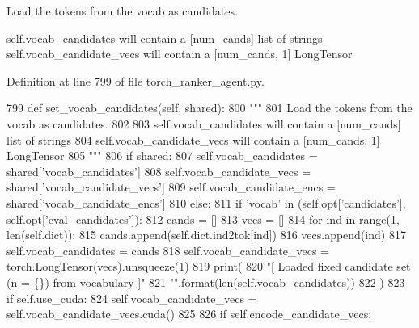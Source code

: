 \begin{DoxyVerb}Load the tokens from the vocab as candidates.

self.vocab_candidates will contain a [num_cands] list of strings
self.vocab_candidate_vecs will contain a [num_cands, 1] LongTensor
\end{DoxyVerb}
 

Definition at line 799 of file torch\+\_\+ranker\+\_\+agent.\+py.


\begin{DoxyCode}
799     \textcolor{keyword}{def }set\_vocab\_candidates(self, shared):
800         \textcolor{stringliteral}{"""}
801 \textcolor{stringliteral}{        Load the tokens from the vocab as candidates.}
802 \textcolor{stringliteral}{}
803 \textcolor{stringliteral}{        self.vocab\_candidates will contain a [num\_cands] list of strings}
804 \textcolor{stringliteral}{        self.vocab\_candidate\_vecs will contain a [num\_cands, 1] LongTensor}
805 \textcolor{stringliteral}{        """}
806         \textcolor{keywordflow}{if} shared:
807             self.vocab\_candidates = shared[\textcolor{stringliteral}{'vocab\_candidates'}]
808             self.vocab\_candidate\_vecs = shared[\textcolor{stringliteral}{'vocab\_candidate\_vecs'}]
809             self.vocab\_candidate\_encs = shared[\textcolor{stringliteral}{'vocab\_candidate\_encs'}]
810         \textcolor{keywordflow}{else}:
811             \textcolor{keywordflow}{if} \textcolor{stringliteral}{'vocab'} \textcolor{keywordflow}{in} (self.opt[\textcolor{stringliteral}{'candidates'}], self.opt[\textcolor{stringliteral}{'eval\_candidates'}]):
812                 cands = []
813                 vecs = []
814                 \textcolor{keywordflow}{for} ind \textcolor{keywordflow}{in} range(1, len(self.dict)):
815                     cands.append(self.dict.ind2tok[ind])
816                     vecs.append(ind)
817                 self.vocab\_candidates = cands
818                 self.vocab\_candidate\_vecs = torch.LongTensor(vecs).unsqueeze(1)
819                 print(
820                     \textcolor{stringliteral}{"[ Loaded fixed candidate set (n = \{\}) from vocabulary ]"}
821                     \textcolor{stringliteral}{""}.\hyperlink{namespaceparlai_1_1chat__service_1_1services_1_1messenger_1_1shared__utils_a32e2e2022b824fbaf80c747160b52a76}{format}(len(self.vocab\_candidates))
822                 )
823                 \textcolor{keywordflow}{if} self.use\_cuda:
824                     self.vocab\_candidate\_vecs = self.vocab\_candidate\_vecs.cuda()
825 
826                 \textcolor{keywordflow}{if} self.encode\_candidate\_vecs:

\end{DoxyCode}
